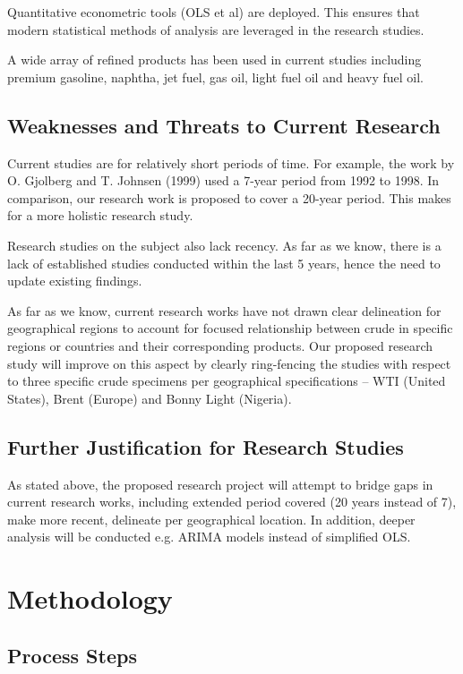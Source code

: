 \documentclass[a4paper,10pt]{article}
\begin{document}
Quantitative econometric tools (OLS et al) are deployed. This ensures that modern statistical methods of analysis are leveraged in the research studies.

A wide array of refined products has been used in current studies including premium gasoline, naphtha, jet fuel, gas oil, light fuel oil and heavy fuel oil.

\subsection{Weaknesses and Threats to Current Research}
Current studies are for relatively short periods of time. For example, the work by O. Gjolberg and T. Johnsen (1999) used a 7-year period from 1992 to 1998. In comparison, our research work is proposed to cover a 20-year period. This makes for a more holistic research study.


Research studies on the subject also lack recency. As far as we know, there is a lack of established studies conducted within the last 5 years, hence the need to update existing findings.


As far as we know, current research works have not drawn clear delineation for geographical regions to account for focused relationship between crude in specific regions or countries and their corresponding products. Our proposed research study will improve on this aspect by clearly ring-fencing the studies with respect to three specific crude specimens per geographical specifications – WTI (United States), Brent (Europe) and Bonny Light (Nigeria).
\subsection{Further Justification for Research Studies}
As stated above, the proposed research project will attempt to bridge gaps in current research works, including extended period covered (20 years instead of 7), make more recent, delineate per geographical location. In addition, deeper analysis will be conducted e.g. ARIMA models instead of simplified OLS.

\section{Methodology}
\subsection{Process Steps}
\end{document}
